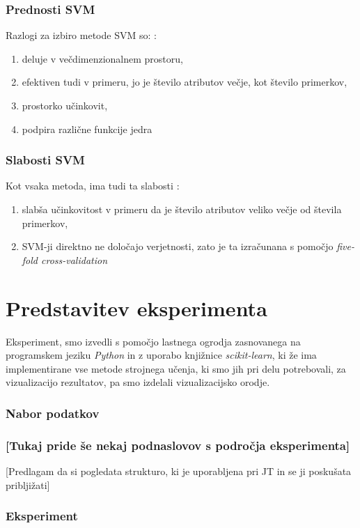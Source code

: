 \documentclass{acm_proc_article-sp}
\begin{document}
\subsubsection{Prednosti SVM}
Razlogi za izbiro metode SVM so: \cite{SciDev}:
\begin{enumerate}
\item{deluje v večdimenzionalnem prostoru,}
\item{efektiven tudi v primeru, jo je število atributov večje, kot število primerkov,}
\item{prostorko učinkovit,}
\item{podpira različne funkcije jedra}
\end{enumerate}

\subsubsection{Slabosti SVM}
Kot vsaka metoda, ima tudi ta slabosti \cite{SciDev}:
\begin{enumerate}
\item{slabša učinkovitost v primeru da je število atributov veliko večje od števila primerkov,}
\item{SVM-ji direktno ne določajo verjetnosti, zato je ta izračunana s pomočjo \textit{five-fold cross-validation}}
\end{enumerate}


\section{Predstavitev eksperimenta}
Eksperiment, smo izvedli s pomočjo lastnega ogrodja zasnovanega na programskem jeziku \textit{Python} in z uporabo knjižnice \textit{scikit-learn}, ki že ima implementirane vse metode strojnega učenja, ki smo jih pri delu potrebovali, za vizualizacijo rezultatov, pa smo izdelali vizualizacijsko orodje. 


\subsubsection{Nabor podatkov}


\subsubsection{[Tukaj pride še nekaj podnaslovov s področja eksperimenta]}
[Predlagam da si pogledata strukturo, ki je uporabljena pri JT in se ji poskušata pribljižati]

\subsubsection{Eksperiment}
\end{document}
